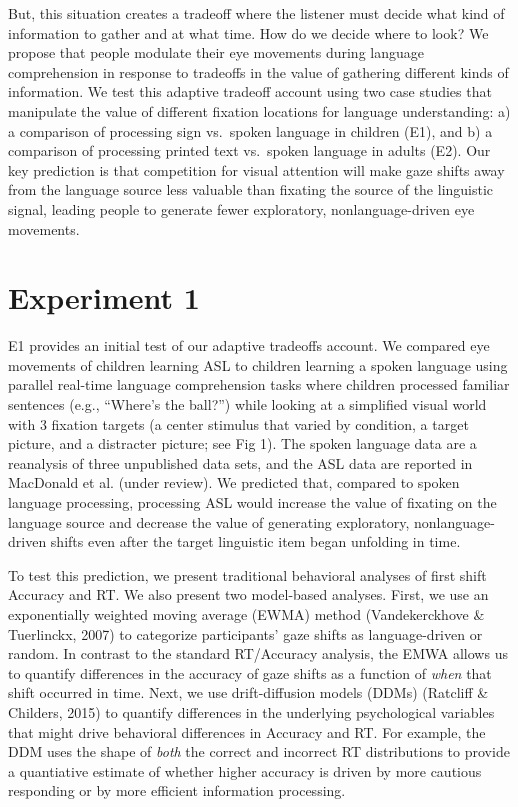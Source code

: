 \documentclass[10pt, letterpaper]{article}
\begin{document}
But, this situation creates a tradeoff where the listener must decide
what kind of information to gather and at what time. How do we decide
where to look? We propose that people modulate their eye movements
during language comprehension in response to tradeoffs in the value of
gathering different kinds of information. We test this adaptive tradeoff
account using two case studies that manipulate the value of different
fixation locations for language understanding: a) a comparison of
processing sign vs.~spoken language in children (E1), and b) a
comparison of processing printed text vs.~spoken language in adults
(E2). Our key prediction is that competition for visual attention will
make gaze shifts away from the language source less valuable than
fixating the source of the linguistic signal, leading people to generate
fewer exploratory, nonlanguage-driven eye movements.

\section{Experiment 1}\label{experiment-1}

E1 provides an initial test of our adaptive tradeoffs account. We
compared eye movements of children learning ASL to children learning a
spoken language using parallel real-time language comprehension tasks
where children processed familiar sentences (e.g., ``Where's the
ball?'') while looking at a simplified visual world with 3 fixation
targets (a center stimulus that varied by condition, a target picture,
and a distracter picture; see Fig 1). The spoken language data are a
reanalysis of three unpublished data sets, and the ASL data are reported
in MacDonald et al. (under review). We predicted that, compared to
spoken language processing, processing ASL would increase the value of
fixating on the language source and decrease the value of generating
exploratory, nonlanguage-driven shifts even after the target linguistic
item began unfolding in time.

To test this prediction, we present traditional behavioral analyses of
first shift Accuracy and RT. We also present two model-based analyses.
First, we use an exponentially weighted moving average (EWMA) method
(Vandekerckhove \& Tuerlinckx, 2007) to categorize participants' gaze
shifts as language-driven or random. In contrast to the standard
RT/Accuracy analysis, the EMWA allows us to quantify differences in the
accuracy of gaze shifts as a function of \emph{when} that shift occurred
in time. Next, we use drift-diffusion models (DDMs) (Ratcliff \&
Childers, 2015) to quantify differences in the underlying psychological
variables that might drive behavioral differences in Accuracy and RT.
For example, the DDM uses the shape of \emph{both} the correct and
incorrect RT distributions to provide a quantiative estimate of whether
higher accuracy is driven by more cautious responding or by more
efficient information processing.
\end{document}
